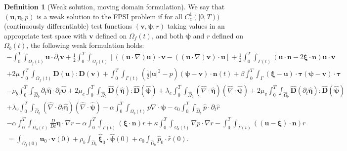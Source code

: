 \documentclass[11pt]{article}
\newcommand{\bd}{\boldsymbol}
\theoremstyle{definition}
\newtheorem{definition}{Definition}[section]
\begin{document}
\begin{definition}[Weak solution, moving domain formulation]\label{weakmoving}
We say that $(\bd{u}, \bd{\eta}, p)$ is a weak solution to the FPSI problem if for all $C_{c}^{1}([0, T))$ (continuously differentiable) test functions $(\bd{v}, \bd{\psi}, r)$ taking values in an appropriate test space with $\bd{v}$ defined on $\Omega_{f}(t)$, and both $\bd{\psi}$ and $r$ defined on $\Omega_{b}(t)$, the following weak formulation holds:
\begin{multline*}
-\int_{0}^{T} \int_{\Omega_{f}(t)} \bd{u} \cdot \partial_{t} \bd{v} + \frac{1}{2} \int_{0}^{T} \int_{\Omega_{f}(t)} [((\bd{u} \cdot \nabla) \bd{u}) \cdot \bd{v} - ((\bd{u} \cdot \nabla) \bd{v}) \cdot \bd{u}] + \frac{1}{2} \int_{0}^{T} \int_{\Gamma(t)} (\bd{u} \cdot \bd{n} - 2\bd{\xi} \cdot \bd{n}) \bd{u} \cdot \bd{v} \\
+ 2\mu \int_{0}^{T} \int_{\Omega_{f}(t)} \bd{D}(\bd{u}) : \bd{D}(\bd{v}) + \int_{0}^{T} \int_{\Gamma(t)} \left(\frac{1}{2} |\bd{u}|^{2} - p\right) (\bd{\psi} - \bd{v}) \cdot \bd{n}(t) + \beta \int_{0}^{T} \int_{\Gamma} (\bd{\xi} - \bd{u}) \cdot \bd{\tau} (\bd{\psi} - \bd{v}) \cdot \bd{\tau} \\
- \rho_{b} \int_{0}^{T} \int_{\hat{\Omega}_{b}} \partial_{t} \hat{\bd{\eta}} \cdot \partial_{t} \hat{\bd{\psi}} + 2\mu_{e} \int_{0}^{T} \int_{\hat{\Omega}_{b}} \hat{\bd{D}}(\hat{\bd{\eta}}) : \hat{\bd{D}}(\hat{\bd{\psi}}) + \lambda_{e} \int_{0}^{T} \int_{\hat{\Omega}_{b}} (\hat{\nabla} \cdot \hat{\bd{\eta}}) (\hat{\nabla} \cdot \hat{\bd{\psi}}) + 2\mu_{v} \int_{0}^{T} \int_{\hat{\Omega}_{b}} \hat{\bd{D}}(\partial_{t}\hat{\bd{\eta}}) : \hat{\bd{D}}(\hat{\bd{\psi}}) \\
+ \lambda_{v} \int_{0}^{T} \int_{\hat{\Omega}_{b}} (\hat{\nabla} \cdot \partial_{t}\hat{\bd{\eta}})(\hat{\nabla} \cdot \hat{\bd{\psi}}) - \alpha \int_{0}^{T} \int_{\Omega_{b}(t)} p \nabla \cdot \bd{\psi} - c_{0} \int_{0}^{T} \int_{\hat{\Omega}_{b}} \hat{p} \cdot \partial_{t}\hat{r} \\
- \alpha \int_{0}^{T} \int_{\Omega_{b}(t)} \frac{D}{Dt} \bd{\eta} \cdot \nabla r - \alpha \int_{0}^{T} \int_{\Gamma(t)} (\bd{\xi} \cdot \bd{n})r + \kappa \int_{0}^{T} \int_{\Omega_{b}(t)} \nabla p \cdot \nabla r - \int_{0}^{T} \int_{\Gamma(t)} ((\bd{u} - \bd{\xi}) \cdot \bd{n}) r \\
= \int_{\Omega_{f}(0)} \bd{u}_0 \cdot \bd{v}(0) + \rho_{b} \int_{\hat{\Omega}_{b}}\hat{\bd{\xi}}_{0}  \cdot \hat{\bd{\psi}}(0) + c_{0} \int_{\hat{\Omega}_{b}} \hat{p}_0 \cdot \hat{r}(0). 
\end{multline*}
\end{definition}
\end{document}
